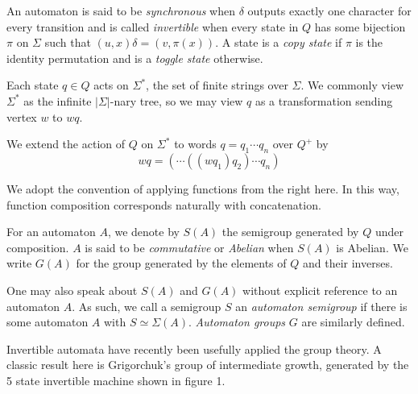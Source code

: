 \documentclass[10pt]{article} %
\newcommand{\defn}[1]{\textit{#1}}
\begin{document}
    An automaton is said to be \defn{synchronous} when $\delta$
    outputs exactly one character for every transition and is called
    \defn{invertible} when every state in $Q$ has some bijection $\pi$
    on $\Sigma$ such that $(u, x)\delta = (v, \pi(x))$. A state is a
    \defn{copy state} if $\pi$ is the identity permutation and is a
    \defn{toggle state} otherwise.

    Each state $q \in Q$ acts on $\Sigma^*$, the set of finite strings
    over $\Sigma$. We commonly view $\Sigma^*$ as the infinite
    $|\Sigma|$-nary tree, so we may view $q$ as a transformation
    sending vertex $w$ to $wq$.

    We extend the action of $Q$ on $\Sigma^*$ to words
    $q = q_1\cdots q_n$ over $Q^+$ by
    \[ wq = (\cdots((w q_1) q_2)\cdots q_n) \]

    We adopt the convention of applying functions from the right
    here. In this way, function composition corresponds naturally with
    concatenation.

    For an automaton $A$, we denote by $S(A)$ the semigroup generated
    by $Q$ under composition. $A$ is said to be \defn{commutative} or
    \defn{Abelian} when $S(A)$ is Abelian. We write $G(A)$ for the
    group generated by the elements of $Q$ and their inverses.

    One may also speak about $S(A)$ and $G(A)$ without explicit
    reference to an automaton $A$. As such, we call a semigroup $S$ an
    \defn{automaton semigroup} if there is some automaton $A$ with
    $S \simeq \Sigma(A)$. \defn{Automaton groups} $G$ are similarly
    defined.

    Invertible automata have recently been usefully applied the group
    theory. A classic result here is Grigorchuk's group of
    intermediate growth, generated by the 5 state invertible machine
    shown in figure 1.
    
\end{document}
